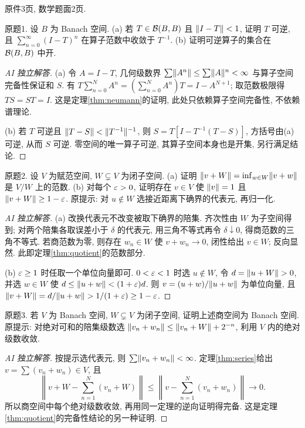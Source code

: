 \label{sec:ps02}
原件3页, 数学题面2页.
\begin{exercise}\label{ps02:1}
原题1. 设 $B$ 为 Banach 空间. (a) 若 $T\in\mathcal B(B,B)$ 且 $\lVert I-T\rVert<1$, 证明 $T$ 可逆, 且 $\sum_{n=0}^\infty(I-T)^n$ 在算子范数中收敛于 $T^{-1}$. (b) 证明可逆算子的集合在 $\mathcal B(B,B)$ 中开.
\end{exercise}
\begin{proof}[AI 独立解答]
(a) 令 $A=I-T$, 几何级数界 $\sum\lVert A^n\rVert\le\sum\lVert A\rVert^n<\infty$ 与算子空间完备性保证和 $S$. 有 $T\sum_{n=0}^NA^n=(\sum_{n=0}^NA^n)T=I-A^{N+1}$; 取范数极限得 $TS=ST=I$. 这是定理\ref{thm:neumann}的证明, 此处只依赖算子空间完备性, 不依赖谱理论.

(b) 若 $T$ 可逆且 $\lVert T-S\rVert<\lVert T^{-1}\rVert^{-1}$, 则 $S=T[I-T^{-1}(T-S)]$, 方括号由(a)可逆, 从而 $S$ 可逆. 零空间的唯一算子可逆, 其算子空间本身也是开集, 另行满足结论.
\end{proof}
\begin{exercise}\label{ps02:2}
原题2. 设 $V$ 为赋范空间, $W\subsetneq V$ 为闭子空间. (a) 证明 $\lVert v+W\rVert=\inf_{w\in W}\lVert v+w\rVert$ 是 $V/W$ 上的范数. (b) 对每个 $\varepsilon>0$, 证明存在 $v\in V$ 使 $\lVert v\rVert=1$ 且 $\lVert v+W\rVert\ge1-\varepsilon$. 原提示: 对 $u\notin W$ 选接近距离下确界的代表元, 再归一化.
\end{exercise}
\begin{proof}[AI 独立解答]
(a) 改换代表元不改变被取下确界的陪集. 齐次性由 $W$ 为子空间得到; 对两个陪集各取误差小于 $\delta$ 的代表元, 用三角不等式再令 $\delta\downarrow0$, 得商范数的三角不等式. 若商范数为零, 则存在 $w_n\in W$ 使 $v+w_n\to0$, 闭性给出 $v\in W$; 反向显然. 此即定理\ref{thm:quotient}的范数部分.

(b) $\varepsilon\ge1$ 时任取一个单位向量即可. $0<\varepsilon<1$ 时选 $u\notin W$, 令 $d=\lVert u+W\rVert>0$, 并选 $w\in W$ 使 $d\le\lVert u+w\rVert<(1+\varepsilon)d$. 则 $v=(u+w)/\lVert u+w\rVert$ 为单位向量, 且 $\lVert v+W\rVert=d/\lVert u+w\rVert>1/(1+\varepsilon)\ge1-\varepsilon$.
\end{proof}
\begin{exercise}\label{ps02:3}
原题3. 若 $V$ 为 Banach 空间, $W\subsetneq V$ 为闭子空间, 证明上述商空间为 Banach 空间. 原提示: 对绝对可和的陪集级数选 $\lVert v_n+w_n\rVert\le\lVert v_n+W\rVert+2^{-n}$, 利用 $V$ 内的绝对级数收敛.
\end{exercise}
\begin{proof}[AI 独立解答]
按提示选代表元, 则 $\sum\lVert v_n+w_n\rVert<\infty$. 定理\ref{thm:series}给出 $v=\sum(v_n+w_n)\in V$, 且
\[
\left\|v+W-\sum_{n=1}^N(v_n+W)\right\|\le\left\|v-\sum_{n=1}^N(v_n+w_n)\right\|\longrightarrow0.
\]
所以商空间中每个绝对级数收敛, 再用同一定理的逆向证明得完备. 这是定理\ref{thm:quotient}的完备性结论的另一种证明.
\end{proof}
